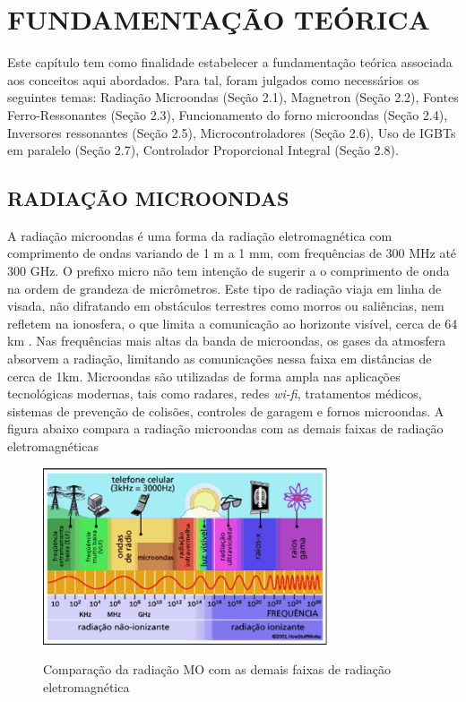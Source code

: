 
\chapter{FUNDAMENTAÇÃO TEÓRICA}
\label{chap:fundamentacaoTeorica}

Este capítulo tem como ﬁnalidade estabelecer a fundamentação teórica associada aos conceitos aqui abordados. Para tal, foram julgados como necessários os seguintes temas: Radiação Microondas (Seção 2.1), Magnetron (Seção 2.2), Fontes Ferro-Ressonantes (Seção 2.3), Funcionamento do forno microondas (Seção 2.4), Inversores ressonantes (Seção 2.5), Microcontroladores (Seção 2.6), Uso de IGBTs em paralelo (Seção 2.7), Controlador Proporcional Integral (Seção 2.8).

\section{RADIAÇÃO MICROONDAS}
\label{sec:radiacaoMicroondas}

A radiação microondas é uma forma da radiação eletromagnética com comprimento de ondas variando de 1 m a 1 mm, com frequências de 300 MHz até 300 GHz. O prefixo micro não tem intenção de sugerir a o comprimento de onda na ordem de grandeza de micrômetros. Este tipo de radiação viaja em linha de visada, não difratando em obstáculos terrestres como morros ou saliências, nem refletem na ionosfera, o que limita a comunicação ao horizonte visível, cerca de 64 km \cite{hitchcock}. Nas frequências mais altas da banda de microondas, os gases da atmosfera absorvem a radiação, limitando as comunicações nessa faixa em distâncias de cerca de 1km. Microondas são utilizadas de forma ampla nas aplicações tecnológicas modernas, tais como radares, redes \textit{wi-fi}, tratamentos médicos, sistemas de prevenção de colisões, controles de garagem e fornos microondas. A figura abaixo compara a radiação microondas com as demais faixas de radiação eletromagnéticas

\begin{figure}[!htb]
    \centering
    \caption{Comparação da radiação MO com as demais faixas de radiação eletromagnética}
    \includegraphics[width=0.75\textwidth]{./dados/figuras/figura_microondas}
    \label{fig:figura-mo}
\end{figure}

